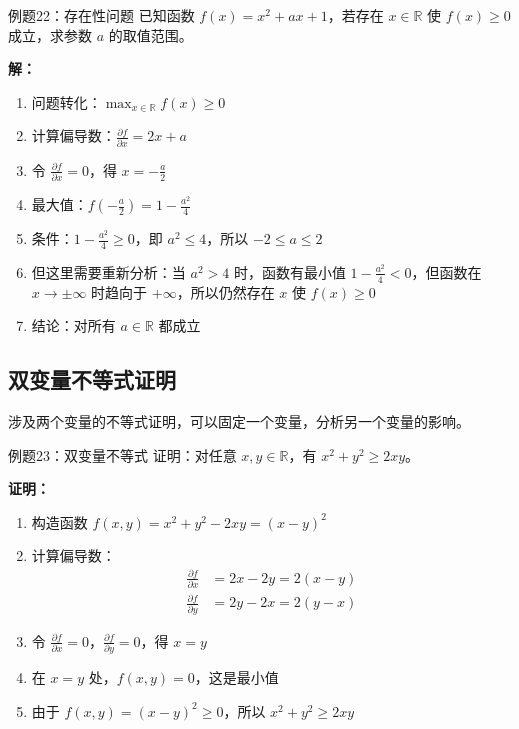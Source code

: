 \documentclass[a4paper,11pt]{ctexart}
\newcommand{\partialder}[2]{\frac{\partial #1}{\partial #2}}
\theoremstyle{definition}
\theoremstyle{remark}
\begin{document}
\begin{examplebox}{例题22：存在性问题}
已知函数 $f(x) = x^2 + ax + 1$，若存在 $x \in \mathbb{R}$ 使 $f(x) \geq 0$ 成立，求参数 $a$ 的取值范围。

\textbf{解：}
\begin{enumerate}
    \item 问题转化：$\max_{x \in \mathbb{R}} f(x) \geq 0$
    \item 计算偏导数：$\partialder{f}{x} = 2x + a$
    \item 令 $\partialder{f}{x} = 0$，得 $x = -\frac{a}{2}$
    \item 最大值：$f(-\frac{a}{2}) = 1 - \frac{a^2}{4}$
    \item 条件：$1 - \frac{a^2}{4} \geq 0$，即 $a^2 \leq 4$，所以 $-2 \leq a \leq 2$
    \item 但这里需要重新分析：当 $a^2 > 4$ 时，函数有最小值 $1 - \frac{a^2}{4} < 0$，但函数在 $x \to \pm\infty$ 时趋向于 $+\infty$，所以仍然存在 $x$ 使 $f(x) \geq 0$
    \item 结论：对所有 $a \in \mathbb{R}$ 都成立
\end{enumerate}
\end{examplebox}

\subsection{双变量不等式证明}

涉及两个变量的不等式证明，可以固定一个变量，分析另一个变量的影响。

\begin{examplebox}{例题23：双变量不等式}
证明：对任意 $x, y \in \mathbb{R}$，有 $x^2 + y^2 \geq 2xy$。

\textbf{证明：}
\begin{enumerate}
    \item 构造函数 $f(x,y) = x^2 + y^2 - 2xy = (x-y)^2$
    \item 计算偏导数：
    \begin{align}
    \partialder{f}{x} &= 2x - 2y = 2(x-y) \\
    \partialder{f}{y} &= 2y - 2x = 2(y-x)
    \end{align}
    \item 令 $\partialder{f}{x} = 0$，$\partialder{f}{y} = 0$，得 $x = y$
    \item 在 $x = y$ 处，$f(x,y) = 0$，这是最小值
    \item 由于 $f(x,y) = (x-y)^2 \geq 0$，所以 $x^2 + y^2 \geq 2xy$
\end{enumerate}
\end{examplebox}
\end{document}
